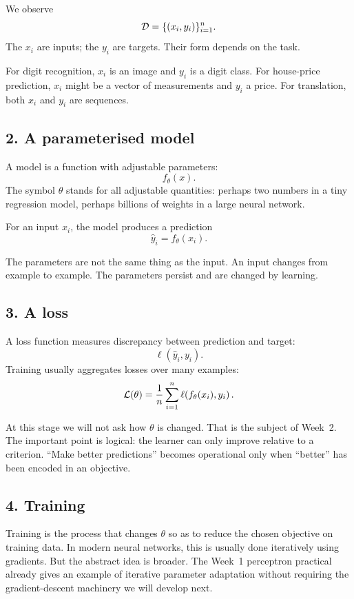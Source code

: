 We observe
\[
  \mathcal{D} = \{(x_i,y_i)\}_{i=1}^{n}.
\]
The \(x_i\) are inputs; the \(y_i\) are targets. Their form depends on the task.

For digit recognition, \(x_i\) is an image and \(y_i\) is a digit class. For house-price prediction, \(x_i\) might be a vector of measurements and \(y_i\) a price. For translation, both \(x_i\) and \(y_i\) are sequences.

\subsection{2. A parameterised model}

A model is a function with adjustable parameters:
\[
  f_{\theta}(x).
\]
The symbol \(\theta\) stands for all adjustable quantities: perhaps two numbers in a tiny regression model, perhaps billions of weights in a large neural network.

For an input \(x_i\), the model produces a prediction
\[
  \hat{y}_i = f_{\theta}(x_i).
\]

The parameters are not the same thing as the input. An input changes from example to example. The parameters persist and are changed by learning.

\subsection{3. A loss}

A loss function measures discrepancy between prediction and target:
\[
  \ell(\hat{y}_i,y_i).
\]
Training usually aggregates losses over many examples:
\[
  \mathcal{L}(\theta)
    = \frac{1}{n}\sum_{i=1}^{n}
      \ell\!\left(f_{\theta}(x_i),y_i\right).
\]

At this stage we will not ask how \(\theta\) is changed. That is the subject of Week~2. The important point is logical: the learner can only improve relative to a criterion. ``Make better predictions'' becomes operational only when ``better'' has been encoded in an objective.

\subsection{4. Training}

Training is the process that changes \(\theta\) so as to reduce the chosen objective on training data. In modern neural networks, this is usually done iteratively using gradients. But the abstract idea is broader. The Week~1 perceptron practical already gives an example of iterative parameter adaptation without requiring the gradient-descent machinery we will develop next.

